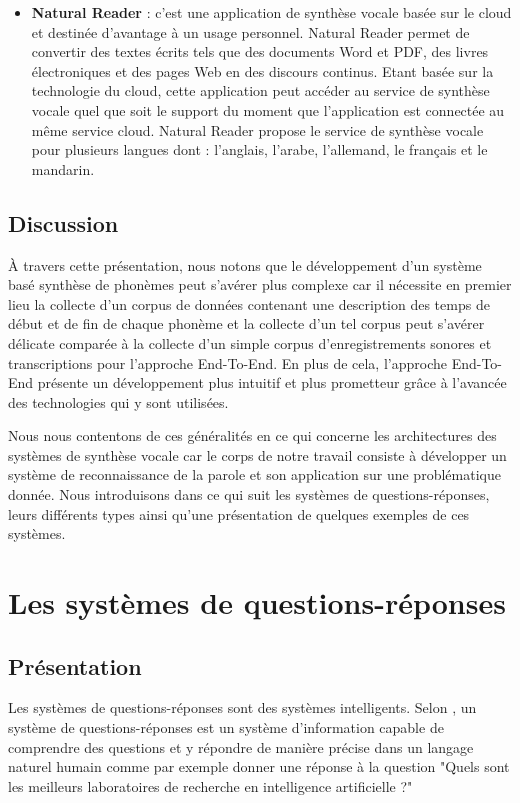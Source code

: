 \begin{itemize}
    \item \textbf{Natural Reader} : c'est une application de synthèse vocale basée sur le cloud et destinée d'avantage à un usage personnel. Natural Reader \cite{naturalreader} permet de convertir des textes écrits tels que des documents Word et PDF, des livres électroniques et des pages Web en des discours continus. Etant basée sur la technologie du cloud, cette application peut accéder au service de synthèse vocale quel que soit le support du moment que l'application est connectée au même service cloud. Natural Reader propose le service de synthèse vocale pour plusieurs langues dont : l'anglais, l'arabe, l'allemand, le français et le mandarin.
\end{itemize}

\subsection{Discussion}
À travers cette présentation, nous notons que le développement d'un système basé synthèse de phonèmes peut s'avérer plus complexe car il nécessite en premier lieu la collecte d'un corpus de données contenant une description des temps de début et de fin de chaque phonème et la collecte d'un tel corpus peut s'avérer délicate comparée à la collecte d'un simple corpus d'enregistrements sonores et transcriptions pour l'approche End-To-End. En plus de cela, l'approche End-To-End présente un développement plus intuitif et plus prometteur grâce à l'avancée des technologies qui y sont utilisées. 

Nous nous contentons de ces généralités en ce qui concerne les architectures des systèmes de synthèse vocale car le corps de notre travail consiste à développer un système de reconnaissance de la parole et son application sur une problématique donnée. Nous introduisons dans ce qui suit les systèmes de questions-réponses, leurs différents types ainsi qu'une présentation de quelques exemples de ces systèmes.

\section{Les systèmes de questions-réponses}
\subsection{Présentation}
Les systèmes de questions-réponses sont des systèmes intelligents. Selon  \newline \cite{QAS}, un système de questions-réponses est un système d'information capable de comprendre des questions et y répondre de manière précise dans un langage naturel humain comme par exemple donner une réponse à la question "Quels sont les meilleurs laboratoires de recherche en intelligence artificielle ?"

